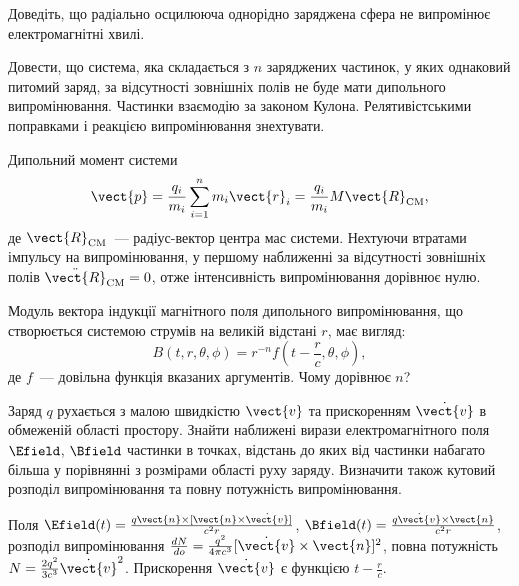 \begin{problem}
Доведіть, що радіально осцилююча однорідно заряджена сфера не випромінює електромагнітні хвилі.
\end{problem}

\begin{problem}
Довести, що система, яка складається з $n$ заряджених частинок, у яких однаковий питомий заряд, за відсутності зовнішніх полів не буде мати дипольного випромінювання. Частинки взаємодію за законом Кулона. Релятивістськими поправками і реакцією випромінювання знехтувати.
\begin{solution}
	Дипольний момент системи
	\[
		\vect{p} = \frac{q_i}{m_i} \sum\limits_{i = 1}^n m_i \vect{r}_i = \frac{q_i}{m_i} M\vect{R}_\mathrm{CM},
	\]
	де $\vect{R}_\mathrm{CM}$~--- радіус-вектор центра мас системи. Нехтуючи втратами імпульсу на випромінювання, у першому наближенні за відсутності зовнішніх полів $\ddot{\vect{R}}_\mathrm{CM} = 0$, отже інтенсивність випромінювання дорівнює нулю.
\end{solution}
\end{problem}

\begin{problem}
Модуль вектора індукції магнітного поля дипольного випромінювання, що  створюється системою струмів на великій відстані $r$, має вигляд:
\[
	B(t,r,\theta,\phi) = r^{-n}f\left(t - \frac{r}{c},\theta, \phi\right),
\]
де $f$~--- довільна функція вказаних аргументів. Чому дорівнює $n$?
\end{problem}

\begin{problem}
Заряд $q$ рухається з малою швидкістю $\vect{v}$ та прискоренням $\dot{\vect{v}}$  в обмеженій області простору. Знайти наближені вирази електромагнітного поля $\Efield$, $\Bfield$ частинки в точках, відстань до яких від частинки набагато більша у порівнянні з розмірами області руху заряду. Визначити також кутовий розподіл випромінювання та повну потужність випромінювання.
\begin{solution}%
	Поля $\Efield(t) = \frac{q\vect{n}\times[ \vect{n} \times \dot{\vect{v}}] }{c^2r}$,
	$\Bfield(t) = \frac{q\dot{\vect{v}}\times\vect{n}}{c^2r}$,
	розподіл випромінювання $\frac{dN}{do} = \frac{q^2}{4\pi c^3}[\dot{\vect{v}}\times\vect{n}]^2$, повна потужність $N = \frac{2q^2}{3c^3}\dot{\vect{v}}^2$. Прискорення $ \dot{\vect{v}} $ є функцією $t - \frac{r}{c}$.
\end{solution}
\end{problem}


